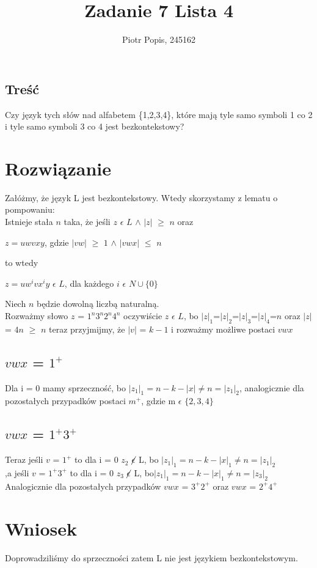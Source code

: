 \documentclass[11pt]{article}
\begin{document}
\title{Zadanie 7 Lista 4}
\author{Piotr Popis, 245162}
\maketitle
\centering

\begin{flushleft}
\section{Treść}
Czy język tych słów nad alfabetem \{1,2,3,4\}, które mają tyle samo symboli 1 co 2 i tyle samo symboli 3 co 4 jest bezkontekstowy?
\end{flushleft}

\begin{flushleft}
\section{Rozwiązanie}
Załóżmy, że język L jest bezkontekstowy.
Wtedy skorzystamy z lematu o pompowaniu:\\
Istnieje stała $n$ taka, że jeśli $z$ $\epsilon$ $ L$ $\wedge$ $| z |$ $\geq$ $n$  oraz \\
\begin{center}
$z = uwvxy$, gdzie $|vw|$ $\geq$ $1$  $\wedge$ $|vwx|$ $\leq$ $n$
\end{center}
to wtedy 
\begin{center}
$z = uw^{i}vx^{i}y$ $\epsilon$ $L$, dla każdego $i$ $\epsilon$ $N\cup\{0\}$ 
\end{center}
Niech $n$ będzie dowolną liczbą naturalną.\\
Rozważmy słowo $z$ = $1^{n}3^{n}2^{n}4^{n}$ oczywiście $z$ $\epsilon$ $L$, bo  $| z |_{1}$=$| z |_{2}$=$| z |_{3}$=$| z |_{4}$=$n$ oraz $| z |$= $4n$ $\geq$ $n$ teraz przyjmijmy, że $|v|$ = $k-1$ i rozważmy możliwe postaci $vwx$\\
\subsection{\quad $vwx$ = $1^{+}$} 
Dla i = 0 mamy sprzeczność, bo $|z_1|_{1}=n-k-|x| \neq n = |z_1|_{2}$, analogicznie dla pozostałych przypadków postaci $m^+$, gdzie m $\epsilon$ $\{2,3,4\}$

\subsection{\quad $vwx$ = $1^{+}3^{+}$} 
Teraz jeśli $v$ = $1^+$ to dla i = 0 $z_2$ \( \cancel{\epsilon}\) L, bo $|z_1|_{1}=n-k-|x|_1 \neq n = |z_1|_{2}$\\
,a jeśli $v$ = $1^{+}3^{+}$ to dla i = 0 $z_3$ \( \cancel{\epsilon}\) L, bo$|z_1|_{1}=n-k-|x|_1 \neq n = |z_3|_{2}$\\
Analogicznie dla pozostałych przypadków $vwx$ = $3^+2^+$ oraz $vwx$ = $2^+4^+$\\
\section{Wniosek}
\begin{center}
Doprowadziliśmy do sprzeczności zatem L nie jest językiem bezkontekstowym.
\end{center}

\end{flushleft}
\end{document}
